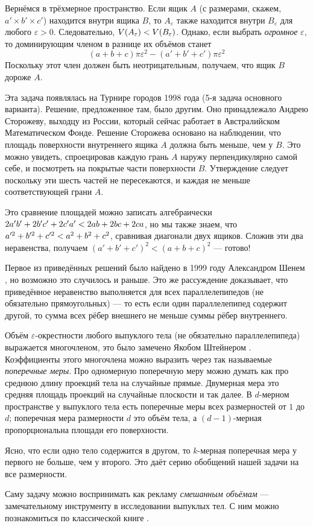 Вернёмся в трёхмерное пространство.
Если ящик $A$ (с размерами, скажем, $a'\times b'\times c'$) находится внутри ящика $B$, то $A_\varepsilon$ также находится внутри $B_\varepsilon$ для любого $\varepsilon > 0$.
Следовательно, $V(A_\varepsilon ) \z< V(B_\varepsilon)$.
Однако, если выбрать \emph{огромное} $\varepsilon$, то доминирующим членом в разнице их объёмов станет
\[(a+b+c)\pi\varepsilon^2-(a'+b'+c')\pi\varepsilon^2\]
Поскольку этот член должен быть неотрицательным, получаем, что ящик $B$ дороже $A$.

Эта задача появлялась на Турнире городов 1998 года (5-я задача основного варианта).
Решение, предложенное там, было другим.
Оно принадлежало Андрею Сторожеву, выходцу из России, который сейчас работает в Австралийском Математическом Фонде.
Решение Сторожева основано на наблюдении, что площадь поверхности внутреннего ящика $A$ должна быть меньше, чем у  $B$.
Это можно увидеть, спроецировав каждую грань $A$ наружу перпендикулярно самой себе, 
и посмотреть на покрытые части поверхности $B$.
Утверждение следует поскольку эти шесть частей не пересекаются, и каждая не меньше соответствующей грани $A$.

Это сравнение площадей можно записать алгебраически $2a'b'\z+2b'c'\z+2c'a' \z< 2ab\z+2bc\z+2ca$, но мы также знаем, что $a'^2\z+b'^2\z+c'^2\z<a^2\z+b^2\z+c^2$, сравнивая диагонали двух ящиков.
Сложив эти два неравенства, получаем 
$(a'+b'+c')^2<(a+b+c)^2$ --- готово!

\begin{addedbytheeditors}
Первое из приведённых решений было найдено в 1999 году Александром Шенем \cite{shen}, но возможно это случилось и раньше.
Это же рассуждение доказывает, что приведённое неравенство выполняется для всех параллелепипедов (не обязательно прямоугольных) --- то есть если один параллелепипед содержит другой, то сумма всех рёбер внешнего не меньше суммы рёбер внутреннего.

Объём $\varepsilon$-окрестности любого выпуклого тела (не обязательно параллелепипеда) выражается многочленом, это было замечено Якобом Штейнером \cite{steiner}.
Коэффициенты этого многочлена можно выразить через так называемые \emph{поперечные меры}.
Про одномерную поперечную меру можно думать как про среднюю длину проекций тела на случайные прямые.
Двумерная мера это средняя площадь проекций на случайные плоскости и так далее.
В $d$-мерном пространстве у выпуклого тела есть поперечные меры всех размерностей от $1$ до $d$;
поперечная мера размерности $d$ это объём тела, а $(d-1)$-мерная пропорциональна площади его поверхности.

Ясно, что если одно тело содержится в другом, то $k$-мерная поперечная мера у первого не больше, чем у второго.
Это даёт серию обобщений нашей задачи на все размерности.

Саму задачу можно воспринимать как рекламу \emph{смешанным объёмам} --- замечательному инструменту в исследовании выпуклых тел.
С ним можно познакомиться по классической книге \cite{burago-zalgaller}.
\end{addedbytheeditors}



